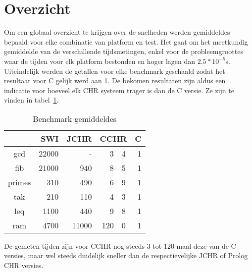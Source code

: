 \section{Overzicht} \label{sec:bench-end}

Om een globaal overzicht te krijgen over de snelheden werden gemiddeldes bepaald voor elke combinatie van platform en test. Het gaat om het meetkundig gemiddelde van de verschillende tijdsmetingen, enkel voor de probleemgroottes waar de tijden voor elk platform bestonden en hoger lagen dan $2.5 * 10^{-5}$s. Uiteindelijk werden de getallen voor elke benchmark geschaald zodat het resultaat voor C gelijk werd aan 1. De bekomen resultaten zijn aldus een indicatie voor hoeveel elk CHR systeem trager is dan de C versie. Ze zijn te vinden in tabel~\ref{tbl:benches}.
\begin{table}
\begin{center}
\begin{tabular}{c|rrr@{.}lr}
 & {\bf SWI} & {\bf JCHR} & \multicolumn{2}{c}{\bf CCHR} & {\bf C} \\
\hline
gcd    & 22000 & -     &   3&4  & 1 \\
fib    & 21000 & 940   &   8&5  & 1 \\
primes & 310   & 490   &   6&9  & 1 \\
tak    & 210   & 110   &   4&3  & 1 \\
leq    & 1100  & 440   &   9&8  & 1 \\
ram    & 4700  & 11000 &  120&0 & 1 \\
\end{tabular}
\caption{Benchmark gemiddeldes}
\label{tbl:benches}
\end{center}
\end{table}
De gemeten tijden zijn voor CCHR nog steeds 3 tot 120 maal deze van de C versies, maar wel steeds duidelijk sneller dan de respectievelijke JCHR of Prolog CHR versies.
